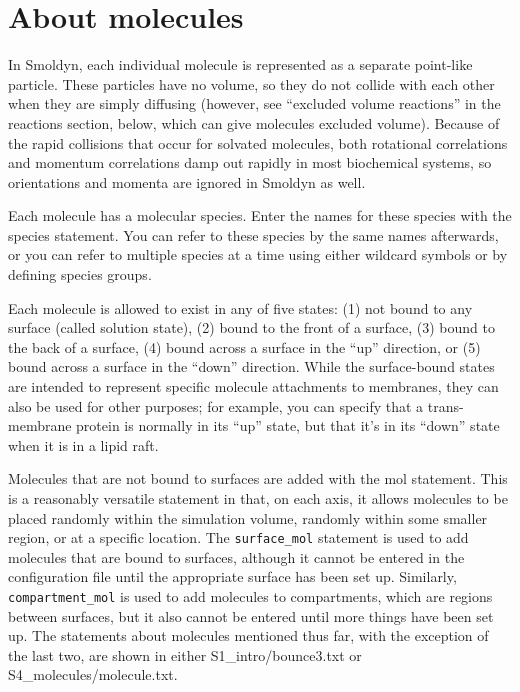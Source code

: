\documentclass {scrbook}
\newcommand {\ttt} {\texttt}
\begin{document}
\section{About molecules}

In Smoldyn, each individual molecule is represented as a separate point-like particle. These particles have no volume, so they do not collide with each other when they are simply diffusing (however, see ``excluded volume reactions'' in the reactions section, below, which can give molecules excluded volume). Because of the rapid collisions that occur for solvated molecules, both rotational correlations and momentum correlations damp out rapidly in most biochemical systems, so orientations and momenta are ignored in Smoldyn as well.

Each molecule has a molecular species. Enter the names for these species with the species statement. You can refer to these species by the same names afterwards, or you can refer to multiple species at a time using either wildcard symbols or by defining species groups.

Each molecule is allowed to exist in any of five states: (1) not bound to any surface (called solution state), (2) bound to the front of a surface, (3) bound to the back of a surface, (4) bound across a surface in the ``up'' direction, or (5) bound across a surface in the ``down'' direction. While the surface-bound states are intended to represent specific molecule attachments to membranes, they can also be used for other purposes; for example, you can specify that a trans-membrane protein is normally in its ``up'' state, but that it's in its ``down'' state when it is in a lipid raft.

Molecules that are not bound to surfaces are added with the mol statement. This is a reasonably versatile statement in that, on each axis, it allows molecules to be placed randomly within the simulation volume, randomly within some smaller region, or at a specific location. The \ttt{surface\_mol} statement is used to add molecules that are bound to surfaces, although it cannot be entered in the configuration file until the appropriate surface has been set up. Similarly, \ttt{compartment\_mol} is used to add molecules to compartments, which are regions between surfaces, but it also cannot be entered until more things have been set up. The statements about molecules mentioned thus far, with the exception of the last two, are shown in either S1\_intro/bounce3.txt or S4\_molecules/molecule.txt.
\end{document}
